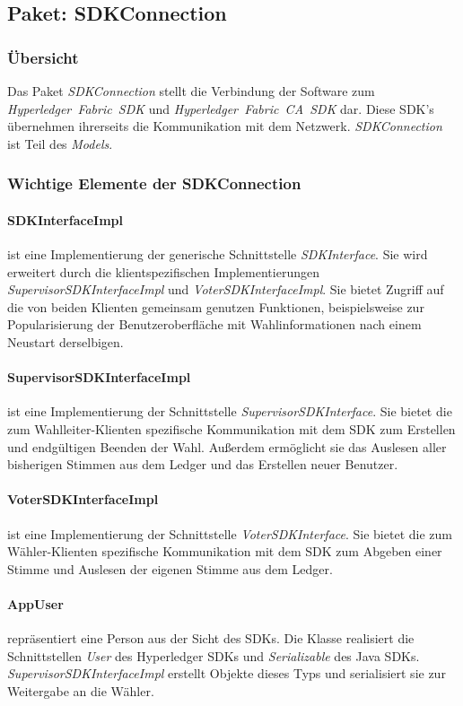 \documentclass[parskip=full]{scrartcl}
\newcommand{\textitx}[1]{\mbox{\textit{#1}}}
\begin{document}
	
	\subsection{Paket: SDKConnection}
	\subsubsection{Übersicht}
	Das Paket \textitx{SDKConnection} stellt die Verbindung der Software zum \textitx{Hyperledger Fabric SDK} und \textitx{Hyperledger Fabric CA SDK} dar. Diese SDK's übernehmen ihrerseits die Kommunikation mit dem Netzwerk. \textitx{SDKConnection} ist Teil des \textitx{Models}.
	\subsubsection{Wichtige Elemente der SDKConnection}
	\paragraph{SDKInterfaceImpl} ist eine Implementierung der generische Schnittstelle \textitx{SDKInterface}. Sie wird erweitert durch die klientspezifischen Implementierungen \textit{SupervisorSDKInterfaceImpl} und \textit{VoterSDKInterfaceImpl}. Sie bietet Zugriff auf die von beiden Klienten gemeinsam genutzen Funktionen, beispielsweise zur Popularisierung der Benutzeroberfläche mit Wahlinformationen nach einem Neustart derselbigen.
	\paragraph{SupervisorSDKInterfaceImpl} ist eine Implementierung der Schnittstelle \textit{SupervisorSDKInterface}. Sie bietet die zum Wahlleiter-Klienten spezifische Kommunikation mit dem SDK zum Erstellen und endgültigen Beenden der Wahl. Außerdem ermöglicht sie das Auslesen aller bisherigen Stimmen aus dem Ledger und das Erstellen neuer Benutzer.
	\paragraph{VoterSDKInterfaceImpl} ist eine Implementierung der Schnittstelle \textit{VoterSDKInterface}. Sie bietet die zum Wähler-Klienten spezifische Kommunikation mit dem SDK zum Abgeben einer Stimme und Auslesen der eigenen Stimme aus dem Ledger.
	\paragraph{AppUser} repräsentiert eine Person aus der Sicht des SDKs. Die Klasse realisiert die Schnittstellen \textitx{User} des Hyperledger SDKs und \textitx{Serializable} des Java SDKs. \textit{SupervisorSDKInterfaceImpl} erstellt Objekte dieses Typs und serialisiert sie zur Weitergabe an die Wähler.
\end{document}
